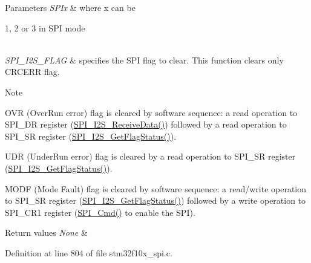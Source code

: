 \begin{DoxyParams}{Parameters}
{\em S\+P\+Ix} & where x can be
\begin{DoxyItemize}
\item 1, 2 or 3 in S\+PI mode 
\end{DoxyItemize}\\
\hline
{\em S\+P\+I\+\_\+\+I2\+S\+\_\+\+F\+L\+AG} & specifies the S\+PI flag to clear. This function clears only C\+R\+C\+E\+RR flag. \\
\hline
\end{DoxyParams}
\begin{DoxyNote}{Note}

\begin{DoxyItemize}
\item O\+VR (Over\+Run error) flag is cleared by software sequence\+: a read operation to S\+P\+I\+\_\+\+DR register (\hyperlink{group___s_p_i___exported___functions_gab77de76547f3bff403236b263b070a30}{S\+P\+I\+\_\+\+I2\+S\+\_\+\+Receive\+Data()}) followed by a read operation to S\+P\+I\+\_\+\+SR register (\hyperlink{agilefox_2library_2src_2stm32f10x__spi_8c_a198b05c19bc61654c789a22e0069054e}{S\+P\+I\+\_\+\+I2\+S\+\_\+\+Get\+Flag\+Status()}).
\item U\+DR (Under\+Run error) flag is cleared by a read operation to S\+P\+I\+\_\+\+SR register (\hyperlink{agilefox_2library_2src_2stm32f10x__spi_8c_a198b05c19bc61654c789a22e0069054e}{S\+P\+I\+\_\+\+I2\+S\+\_\+\+Get\+Flag\+Status()}).
\item M\+O\+DF (Mode Fault) flag is cleared by software sequence\+: a read/write operation to S\+P\+I\+\_\+\+SR register (\hyperlink{agilefox_2library_2src_2stm32f10x__spi_8c_a198b05c19bc61654c789a22e0069054e}{S\+P\+I\+\_\+\+I2\+S\+\_\+\+Get\+Flag\+Status()}) followed by a write operation to S\+P\+I\+\_\+\+C\+R1 register (\hyperlink{group___s_p_i___exported___functions_gaa31357879a65ee1ed7223f3b9114dcf3}{S\+P\+I\+\_\+\+Cmd()} to enable the S\+PI). 
\end{DoxyItemize}
\end{DoxyNote}

\begin{DoxyRetVals}{Return values}
{\em None} & \\
\hline
\end{DoxyRetVals}


Definition at line 804 of file stm32f10x\+\_\+spi.\+c.

